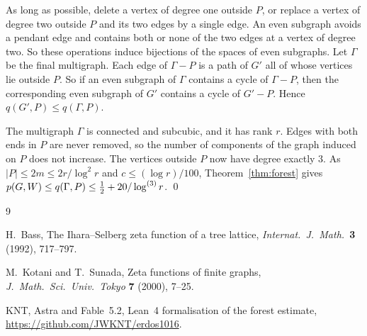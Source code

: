 \documentclass[11pt]{article}
\begin{document}
 As long as possible, delete a vertex of degree one outside $P$, or replace a vertex
of degree two outside $P$ and its two edges by a single edge. An even subgraph avoids a pendant edge
and contains both or none of the two edges at a vertex of degree two. So these operations induce
bijections of the spaces of even subgraphs. Let $\Gamma$ be the final multigraph. Each edge of
$\Gamma-P$ is a path of $G'$ all of whose vertices lie outside $P$. So if an even subgraph of
$\Gamma$ contains a cycle of $\Gamma-P$, then the corresponding even subgraph of $G'$ contains a
cycle of $G'-P$. Hence $q(G',P)\le q(\Gamma,P)$.

 The multigraph $\Gamma$ is connected and subcubic, and it has rank $r$.
Edges with both ends in $P$ are never removed, so the number of components of the graph induced
on $P$ does not increase. The vertices outside $P$ now have degree exactly $3$. As
$|P|\le2m\le2r/\log^{2}r$ and $c\le(\log r)/100$, Theorem~\ref{thm:forest} gives
$p(G,W)\le q(\Gamma,P)\le\tfrac12+20/\log^{(3)}r$. \qed

\begin{thebibliography}{9}\small

 H.~Bass, The Ihara--Selberg zeta function of a tree lattice, \emph{Internat.\
J.~Math.}\ \textbf{3} (1992), 717--797.

 M.~Kotani and T.~Sunada, Zeta functions of finite graphs, \emph{J.~Math.\ Sci.\ Univ.\
Tokyo} \textbf{7} (2000), 7--25.

 KNT, Astra and Fable~5.2, Lean~4 formalisation of the forest estimate,
\url{https://github.com/JWKNT/erdos1016}.

\end{thebibliography}
\end{document}
